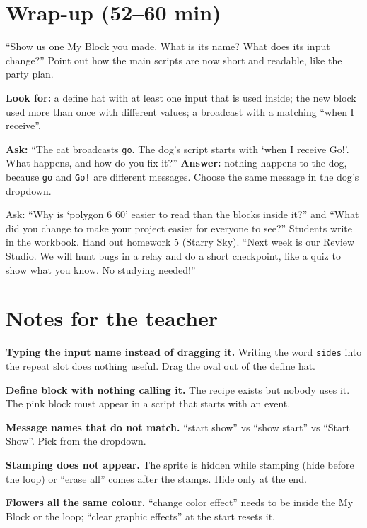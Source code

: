 \section{Wrap-up (52--60 min)}
\begin{teacherscript}
\enquote{Show us one My Block you made. What is its name? What does its input change?} Point out how the main scripts are now short and readable, like the party plan.
\end{teacherscript}

\begin{formativecheck}
\textbf{Look for:} a define hat with at least one input that is used inside; the new block used more than once with different values; a broadcast with a matching \enquote{when I receive}.

\textbf{Ask:} \enquote{The cat broadcasts \texttt{go}. The dog's script starts with \enquote{when I receive Go!}. What happens, and how do you fix it?}
\textbf{Answer:} nothing happens to the dog, because \texttt{go} and \texttt{Go!} are different messages. Choose the same message in the dog's dropdown.
\end{formativecheck}

\begin{reflection}
Ask: \enquote{Why is \enquote{polygon 6 60} easier to read than the blocks inside it?} and \enquote{What did you change to make your project easier for everyone to see?} Students write in the workbook. Hand out homework 5 (Starry Sky). \enquote{Next week is our Review Studio. We will hunt bugs in a relay and do a short checkpoint, like a quiz to show what you know. No studying needed!}
\end{reflection}

\section{Notes for the teacher}
\begin{commonmistakes}
  \item \textbf{Typing the input name instead of dragging it.} Writing the word \texttt{sides} into the repeat slot does nothing useful. Drag the oval out of the define hat.
  \item \textbf{Define block with nothing calling it.} The recipe exists but nobody uses it. The pink block must appear in a script that starts with an event.
  \item \textbf{Message names that do not match.} \enquote{start show} vs \enquote{show start} vs \enquote{Start Show}. Pick from the dropdown.
  \item \textbf{Stamping does not appear.} The sprite is hidden while stamping (hide before the loop) or \enquote{erase all} comes after the stamps. Hide only at the end.
  \item \textbf{Flowers all the same colour.} \enquote{change color effect} needs to be inside the My Block or the loop; \enquote{clear graphic effects} at the start resets it.
\end{commonmistakes}

